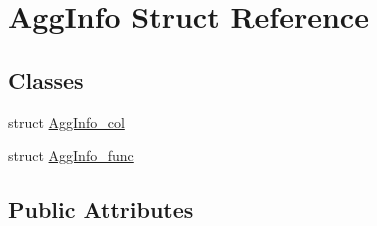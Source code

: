 \hypertarget{struct_agg_info}{\section{Agg\-Info Struct Reference}
\label{struct_agg_info}
}
\subsection*{Classes}
\begin{DoxyCompactItemize}
\item 
struct \hyperlink{struct_agg_info_1_1_agg_info__col}{Agg\-Info\-\_\-col}
\item 
struct \hyperlink{struct_agg_info_1_1_agg_info__func}{Agg\-Info\-\_\-func}
\end{DoxyCompactItemize}
\subsection*{Public Attributes}
